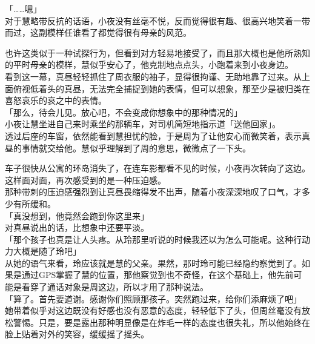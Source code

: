 「……嗯」\\

对于慧略带反抗的话语，小夜没有丝毫不悦，反而觉得很有趣、很高兴地笑着一带而过，这副模样任谁看了都觉得很有母亲的风范。

也许这类似于一种试探行为，但看到对方轻易地接受了，而且那大概也是他所熟知的平时母亲的模样，慧似乎安心了，他克制地点点头，小跑着来到小夜身边。\\

看到这一幕，真昼轻轻抓住了周衣服的袖子，显得很拘谨、无助地靠了过来。从上面俯视低着头的真昼，无法完全捕捉到她的表情，但可以想象，那至少是被归类在喜怒哀乐的哀之中的表情。\\

「那么，待会儿见。放心吧，不会变成你想象中的那种情况的」\\

小夜让慧坐进自己来时乘坐的那辆车，对司机简短地指示道「送他回家」。\\

透过后座的车窗，依然能看到慧担忧的脸，于是周为了让他安心而微笑着，表示真昼的事情就交给他。慧似乎理解到了周的意思，微微点了一下头。

车子很快从公寓的环岛消失了，在连车影都看不见的时候，小夜再次转向了这边。\\

这样面对面，再次感受到的是一种压迫感。\\

那种带刺的压迫感强烈到让真昼畏缩得发不出声，随着小夜深深地叹了口气，才多少有所缓和。\\

「真没想到，他竟然会跑到你这里来」\\

对真昼说出的话，比想象中还要平淡。\\

「那个孩子也真是让人头疼。从玲那里听说的时候我还以为怎么可能呢。这种行动力大概是随了玲吧」\\

从她的语气来看，玲应该就是慧的父亲。果然，那时玲可能已经隐约察觉到了。如果是通过GPS掌握了慧的位置，那他察觉到也不奇怪，在这个基础上，他先前可能是看穿了通话对象是周这边，所以才用了那种说法。\\

「算了。首先要道谢。感谢你们照顾那孩子。突然跑过来，给你们添麻烦了吧」\\

她带着似乎对这边既没有好感也没有恶意的态度，轻轻低下了头，但周丝毫没有放松警惕。只是，要是露出那种明显像是在炸毛一样的态度也很失礼，所以他始终在脸上贴着对外的笑容，缓缓摇了摇头。\\

